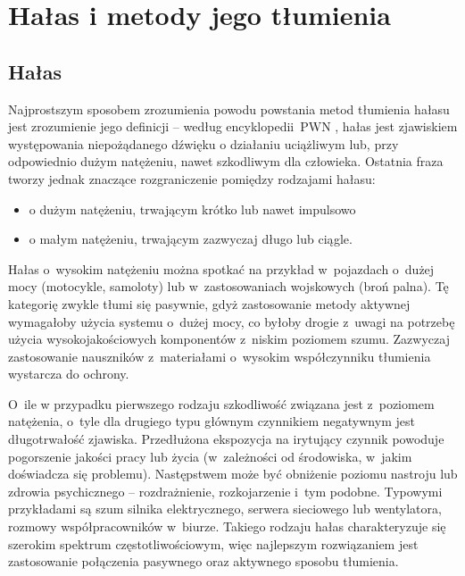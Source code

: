 \chapter{Hałas i metody jego tłumienia}
\label{cha:teoria}

\section{Hałas}
\label{sec:hałas}
Najprostszym sposobem zrozumienia powodu powstania metod tłumienia hałasu jest zrozumienie jego definicji -- według encyklopedii~PWN \cite{PWN}, hałas jest zjawiskiem występowania niepożądanego dźwięku o działaniu uciążliwym lub, przy odpowiednio dużym natężeniu, nawet szkodliwym dla człowieka. Ostatnia fraza tworzy jednak znaczące rozgraniczenie pomiędzy rodzajami hałasu:
\begin{itemize}
	\item o dużym natężeniu, trwającym krótko lub nawet impulsowo
	\item o małym natężeniu, trwającym zazwyczaj długo lub ciągle.
\end{itemize}
Hałas o~wysokim natężeniu można spotkać na przykład w~pojazdach o~dużej mocy (motocykle, samoloty) lub w~zastosowaniach wojskowych (broń palna). Tę kategorię zwykle tłumi się pasywnie, gdyż zastosowanie metody aktywnej wymagałoby użycia systemu o~dużej mocy, co byłoby drogie z~uwagi na potrzebę użycia wysokojakościowych komponentów z~niskim poziomem szumu. Zazwyczaj zastosowanie nauszników z~materiałami o~wysokim współczynniku tłumienia wystarcza do ochrony.

O~ile w przypadku pierwszego rodzaju szkodliwość związana jest z~poziomem natężenia, o~tyle dla drugiego typu głównym czynnikiem negatywnym jest długotrwałość zjawiska. Przedłużona ekspozycja na irytujący czynnik powoduje pogorszenie jakości pracy lub życia (w~zależności od środowiska, w~jakim doświadcza się problemu). Następstwem może być obniżenie poziomu nastroju lub zdrowia psychicznego -- rozdrażnienie, rozkojarzenie i~tym podobne. Typowymi przykładami są szum silnika elektrycznego, serwera sieciowego lub wentylatora, rozmowy współpracowników w~biurze. Takiego rodzaju hałas charakteryzuje się szerokim spektrum częstotliwościowym, więc najlepszym rozwiązaniem jest zastosowanie połączenia pasywnego oraz aktywnego sposobu tłumienia. 
